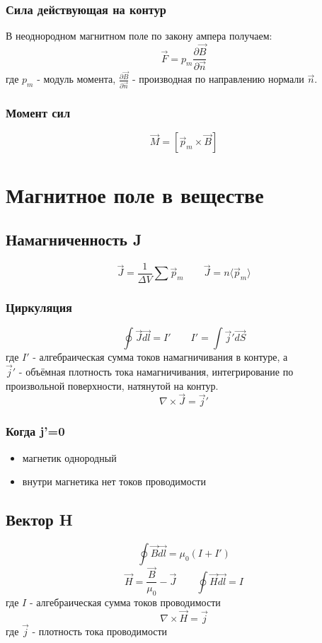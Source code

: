 \documentclass{article}
\begin{document}
\subsubsection{Сила действующая на контур}
В неоднородном магнитном поле по закону ампера получаем:
\[\vec{F}=p_{m}\frac{\partial\vec{B}}{\partial\vec{n}}\]
где $p_{m}$ - модуль момента, $\frac{\partial\vec{B}}{\partial\vec{n}}$ - производная по направлению нормали $\vec{n}$.
\subsubsection{Момент сил}
\[\vec{M}=[\vec{p}_{m}\times\vec{B}]\]


\section{Магнитное поле в веществе}

\subsection{Намагниченность J}
\[\vec{J}=\frac{1}{\Delta V}\sum \vec{p}_{m} \qquad \vec{J}=n\langle\vec{p}_{m}\rangle\]
\subsubsection{Циркуляция}
\[\oint\vec{J}\vec{dl}=I' \qquad I'=\int\vec{j}'\vec{dS}\]
где $I'$ - алгебраическая сумма токов намагничивания в контуре, а \\ $\vec{j}'$ - объёмная плотность тока намагничивания, интегрирование по \\ произвольной поверхности, натянутой на контур.
\[\nabla\times\vec{J}=\vec{j}'\]
\subsubsection{Когда j'=0}
\begin{itemize}
    \item магнетик однородный
    \item внутри магнетика нет токов проводимости
\end{itemize}

\subsection{Вектор H}
\[\oint\vec{B}\vec{dl}=\mu_{0}(I+I')\]
\[\vec{H}=\frac{\vec{B}}{\mu_{0}}-\vec{J} \qquad \oint\vec{H}\vec{dl}=I\]
где $I$ - алгебраическая сумма токов проводимости
\[\nabla\times\vec{H}=\vec{j}\]
где $\vec{j}$ - плотность тока проводимости
\end{document}
